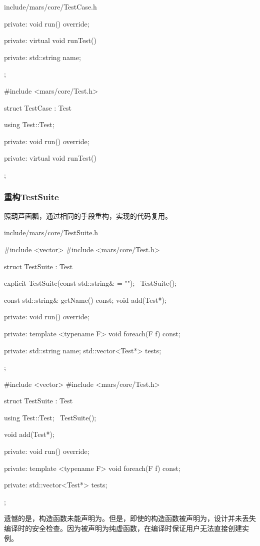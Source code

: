 \begin{content}
\begin{diff}{include/mars/core/TestCase.h}
\begin{minicpp}
{private:
  void run() override;

private:
  virtual void runTest() {}

private:
  std::string name;  
};
 \end{minicpp}
\tcblower
 \begin{minicpp}
#include <mars/core/Test.h>

struct TestCase : Test {
  using Test::Test;

private:
  void run() override;

private:
  virtual void runTest() {}
};
 \end{minicpp}
\end{diff}

\subsubsection{重构TestSuite}

照葫芦画瓢，通过相同的手段重构，实现的代码复用。

\begin{diff}{include/mars/core/TestSuite.h}
 \begin{minicpp}
#include <vector>
#include <mars/core/Test.h>

struct TestSuite : Test {
  explicit TestSuite(const std::string& = "");
  ~TestSuite();

  const std::string& getName() const;
  void add(Test*);

private:
  void run() override;

private:
  template <typename F>
  void foreach(F f) const;

private:
  std::string name;
  std::vector<Test*> tests;
};
 \end{minicpp}
\tcblower
 \begin{minicpp}
#include <vector>
#include <mars/core/Test.h>

struct TestSuite : Test {
  using Test::Test;
  ~TestSuite();

  void add(Test*);

private:
  void run() override;

private:
  template <typename F>
  void foreach(F f) const;

private:
  std::vector<Test*> tests;
};
 \end{minicpp}
\end{diff}

遗憾的是，构造函数未能声明为。但是，即使的构造函数被声明为，设计并未丢失编译时的安全检查。因为被声明为纯虚函数，在编译时保证用户无法直接创建实例。


\end{content}
